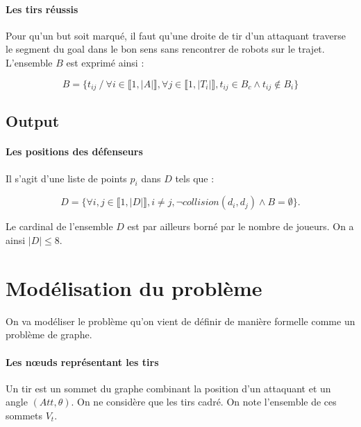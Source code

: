 \documentclass{article}
\begin{document}
\paragraph{Les tirs réussis}
Pour qu'un but soit marqué, il faut qu'une droite de tir d'un attaquant traverse le segment du goal dans le bon sens sans rencontrer de robots sur le trajet. L'ensemble $B$ est exprimé ainsi :

\begin{equation*}
    B = \{t_{ij} \ / \ \forall i \in \llbracket 1, |A| \rrbracket, \forall j \in \llbracket 1, |T_i| \rrbracket, t_{ij}  \in B_c \wedge t_{ij} \notin B_i  \}
\end{equation*}



\subsection{Output}

\paragraph{Les positions des défenseurs} Il s'agit d'une liste de points $p_i$ dans $D$ tels que :

\begin{equation*}
D = \{ \forall i, j \in \llbracket 1, |D| \rrbracket, i \ne j, \neg collision(d_i, d_j) \wedge B = \emptyset \}.
\end{equation*}

Le cardinal de l'ensemble $D$ est par ailleurs borné par le nombre de joueurs. On a ainsi $|D| \leqslant 8$.



\section{Modélisation du problème}


On va modéliser le problème qu'on vient de définir de manière formelle comme un problème de graphe.

\paragraph{Les n\oe uds représentant les tirs}
Un tir est un sommet du graphe combinant la position d'un attaquant et un angle $(Att, \theta)$. On ne considère que les tirs cadré. On note l'ensemble de ces sommets $V_t$.
\end{document}
